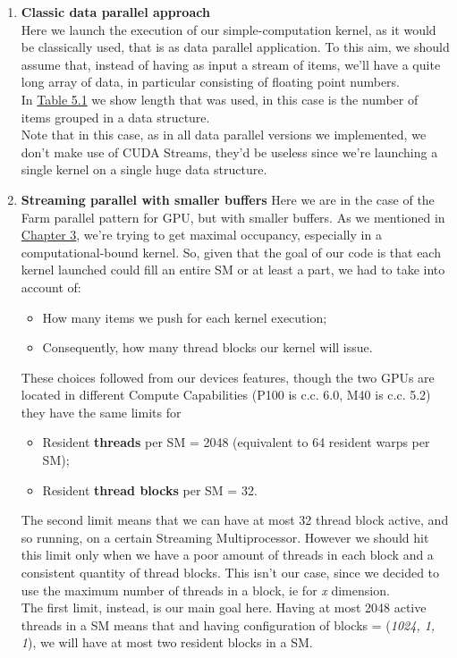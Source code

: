 	
\begin{enumerate}
	\item \textbf{Classic data parallel approach}\\
		Here we launch the execution of our simple-computation kernel, as it would be classically used, that is as data parallel application.
		To this aim, we should assume that, instead of having as input a stream of items, we'll have a quite long array of data, in particular consisting of floating point numbers.\\
		In \hyperref[tab:cosdata]{Table 5.1} we show length that was used, in this case is the number of items grouped in a data structure.\\
		Note that in this case, as in all data parallel versions we implemented, we don't make use of CUDA Streams, they'd be useless since we're launching a single kernel on a single huge data structure.

		
	\item \textbf{Streaming parallel with smaller buffers}
		Here we are in the case of the Farm parallel pattern for GPU, but with smaller buffers.
		As we mentioned in \hyperref[chap:logic]{Chapter 3}, we're trying to get maximal occupancy, especially in a computational-bound kernel. So, given that the goal of our code is that each kernel launched could fill an entire SM or at least a part, we had to take into account of: 
		\begin{itemize}
			\item How many items we push for each kernel execution;
			\item Consequently, how many thread blocks our kernel will issue.
		\end{itemize}
		These choices followed from our devices features, though the two GPUs are located in different Compute Capabilities (P100 is c.c. 6.0, M40 is c.c. 5.2) they have the same limits for 
		\begin{itemize}
			\item Resident \textbf{threads} per SM = 2048 (equivalent to 64 resident warps per SM);
			\item Resident \textbf{thread blocks} per SM = 32.
		\end{itemize}
		The second limit means that we can have at most 32 thread block active, and so running, on a certain Streaming Multiprocessor. However we should hit this limit only when we have a poor amount of threads in each block and a consistent quantity of thread blocks.
		This isn't our case, since we decided to use the maximum number of threads in a block, ie for \textit{x} dimension.\\
		The first limit, instead, is our main goal here. Having at most 2048 active threads in a SM means that and having configuration of blocks = (\textit{1024, 1, 1}), we will have at most two resident blocks in a SM.
		

\end{enumerate}
